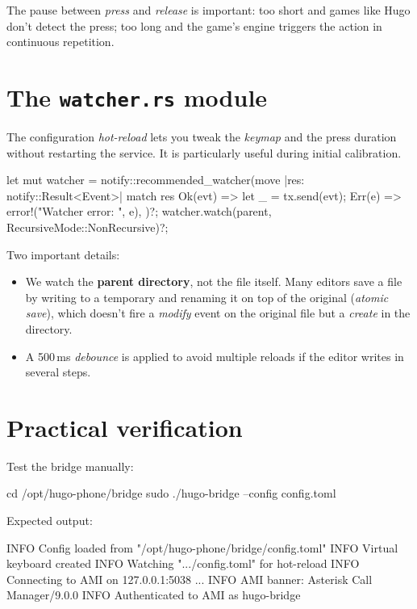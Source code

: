 The pause between \emph{press} and \emph{release} is important: too short and games like Hugo don't detect the press; too long and the game's engine triggers the action in continuous repetition.

\section{The \texttt{watcher.rs} module}

The configuration \emph{hot-reload} lets you tweak the \emph{keymap} and the press duration without restarting the service. It is particularly useful during initial calibration.

\begin{rustcode}
let mut watcher = notify::recommended_watcher(move |res: notify::Result<Event>| {
    match res {
        Ok(evt) => { let _ = tx.send(evt); }
        Err(e) => error!("Watcher error: {}", e),
    }
})?;
watcher.watch(parent, RecursiveMode::NonRecursive)?;
\end{rustcode}

Two important details:

\begin{itemize}
  \item We watch the \textbf{parent directory}, not the file itself. Many editors save a file by writing to a temporary and renaming it on top of the original (\emph{atomic save}), which doesn't fire a \emph{modify} event on the original file but a \emph{create} in the directory.
  \item A 500\,ms \emph{debounce} is applied to avoid multiple reloads if the editor writes in several steps.
\end{itemize}

\section{Practical verification}

Test the bridge manually:

\begin{shellcode}
cd /opt/hugo-phone/bridge
sudo ./hugo-bridge --config config.toml
\end{shellcode}

Expected output:

\begin{plaincode}
INFO Config loaded from "/opt/hugo-phone/bridge/config.toml"
INFO Virtual keyboard created
INFO Watching ".../config.toml" for hot-reload
INFO Connecting to AMI on 127.0.0.1:5038 ...
INFO AMI banner: Asterisk Call Manager/9.0.0
INFO Authenticated to AMI as hugo-bridge
\end{plaincode}

